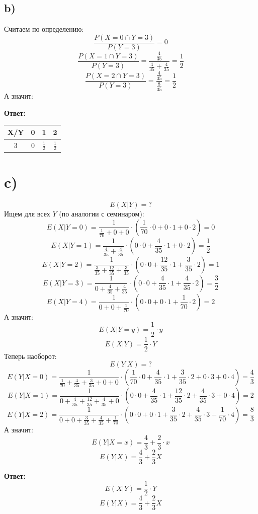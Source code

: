 \documentclass[a4paper,12pt]{article}
\begin{document}
\subsection*{b)}
Считаем по определению:
\[
\frac{P(X = 0 \cap Y = 3)}{P(Y = 3)} = 0
\]
\[
\frac{P(X = 1 \cap Y = 3)}{P(Y = 3)}  = 
\frac{\frac{4}{35}}{\frac{4}{35} +\frac{4}{35} } = \frac{1}{2}
\]
\[
\frac{P(X = 2\cap Y = 3)}{P(Y = 3)}  = 
\frac{\frac{4}{35}}{\frac{8}{35}} = \frac{1}{2}
\]
А значит:
\begin{center}
\textbf{Ответ: } 
\end{center}
\begin{center}
\renewcommand{\arraystretch}{1.5}
\renewcommand{\tabcolsep}{0.5cm}
\begin{tabular}{|c|c|c|c|}
\hline
X/Y & 0 & 1 & 2 \\
\hline
3 & 0 & $\frac12$ &$\frac12$   \\
\hline
\end{tabular}
\end{center}
\section*{c)}
\[
E(X | Y) = ?
\]
Ищем для всех $Y$ (по аналогии с семинаром):
\[
E(X | Y = 0) = \frac{1}{\frac{1}{70} + 0  + 0} \cdot \left(
\frac{1}{70} \cdot 0 + 0 \cdot 1 + 0  \cdot 2
\right) = 0
\]
\[
E(X | Y = 1) = \frac{1}{\frac{4}{35} + \frac{4}{35}} \cdot \left(
0 \cdot 0 + \frac{4}{35} \cdot 1+ 0  \cdot 2
\right) = \frac{1}{2}
\]
\[
E(X | Y = 2)  = \frac{1}{\frac{3}{35} +\frac{12}{35}  + \frac{3}{35}  } \cdot \left(
0 \cdot 0+ \frac{12}{35}  \cdot 1+ \frac{3}{35} \cdot 2
\right) = 1
\]
\[
E(X | Y = 3)  = \frac{1}{0 +\frac{4}{35}  + \frac{4}{35}  } \cdot \left(
0 \cdot 0+ \frac{4}{35}  \cdot 1+ \frac{4}{35} \cdot 2
\right) = \frac32
\]
\[
E(X | Y = 4)  = \frac{1}{0 + 0 + \frac{1}{70}} \cdot \left(
0 \cdot 0+ 0  \cdot 1+ \frac{1}{70} \cdot 2
\right)  = 2
\]
А значит:
\[
E(X | Y = y) = \frac{1}{2}\cdot y 
\]
\[
E(X | Y) = \frac{1}{2}  \cdot Y 
\]
Теперь наоборот:
\[
E(Y | X) = ?
\]
\[
E(Y | X = 0) = \frac{1}{  \frac{1}{70}+\frac{4}{35}  + \frac{3}{35}  + 0 + 0} \cdot \left(
\frac{1}{70} \cdot 0 + \frac{4}{35} \cdot 1 + \frac{3}{35} \cdot 2 + 0 \cdot 3 + 0 \cdot 4
\right) = \frac43
\]
\[
E(Y | X = 1) = \frac{1}{ 0 +  \frac{4}{35} +\frac{12}{35}  + \frac{4}{35} + 0} \cdot \left(
0 \cdot 0 + \frac{4}{35} \cdot 1 + \frac{12}{35} \cdot 2 + \frac{4}{35} \cdot 3 + 0 \cdot 4
\right) = 2
\]
\[
E(Y | X = 2) = \frac{1}{ 0  + 0 +  \frac{3}{35} +\frac{4}{35}  + \frac{1}{70} } \cdot \left(
0 \cdot 0 + 0 \cdot 1 + \frac{3}{35} \cdot 2 + \frac{4}{35} \cdot 3 + \frac{1}{70} \cdot 4
\right) = \frac83 
\]
А значит:
\[
E(Y | X = x) = \frac43 + \frac23 \cdot x
\]
\[
E(Y | X) = \frac43 + \frac23 X
\]
\begin{center}
\textbf{Ответ: } 
\[
E(X | Y) = \frac{1}{2}  \cdot Y 
\]
\[
E(Y | X) = \frac43 + \frac23 X
\]
\end{center}
\clearpage
\end{document}
